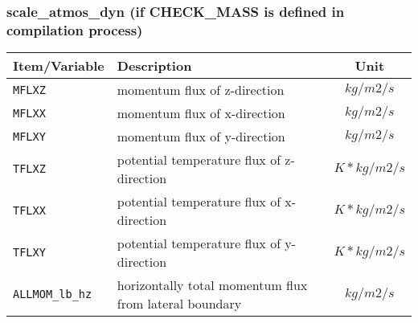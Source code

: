 \subsubsection{scale\_atmos\_dyn (if CHECK\_MASS is defined in compilation process)}
 \begin{tabularx}{150mm}{|l|X|c|} \hline
 \rowcolor[gray]{0.9} Item/Variable & Description  & Unit \\\hline
  \verb|MFLXZ| & momentum flux of z-direction              & $kg/m2/s$  \\\hline
  \verb|MFLXX| & momentum flux of x-direction              & $kg/m2/s$  \\\hline
  \verb|MFLXY| & momentum flux of y-direction              & $kg/m2/s$  \\\hline
  \verb|TFLXZ| & potential temperature flux of z-direction & $K*kg/m2/s$ \\\hline
  \verb|TFLXX| & potential temperature flux of x-direction & $K*kg/m2/s$ \\\hline
  \verb|TFLXY| & potential temperature flux of y-direction & $K*kg/m2/s$ \\\hline
  \verb|ALLMOM_lb_hz| & horizontally total momentum flux from lateral boundary & $kg/m2/s$ \\\hline
 \end{tabularx}

